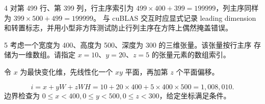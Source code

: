 \begin{solutionexercise}{4}
\variantheading 对第 499 行、第 399 列，行主序索引为 $499\times400+399=199999$，列主序同样为 $399\times500+499=199999$。
\practiceheading 与 cuBLAS 交互时应显式记录 leading dimension 和转置标志，并用小型非方阵测试防止行列主序在方阵上偶然掩盖错误。
\end{solutionexercise}

\begin{solutionexercise}{5}
\problemheading 考虑一个宽度为 400、高度为 500、深度为 300 的三维张量。该张量按行主序
存储为一维数组。请指定 $x=10$、$y=20$、$z=5$ 的张量元素的数组索引。

\approachheading 令 $x$ 为最快变化维，先线性化一个 $xy$ 平面，再加第 $z$ 个平面偏移。

\answerheading
\[
 i=x+yW+zWH=10+20\times400+5\times400\times500=1{,}008{,}010.
\]
边界检查为 $0\le x<400,0\le y<500,0\le z<300$，给定坐标满足条件。


\end{solutionexercise}
